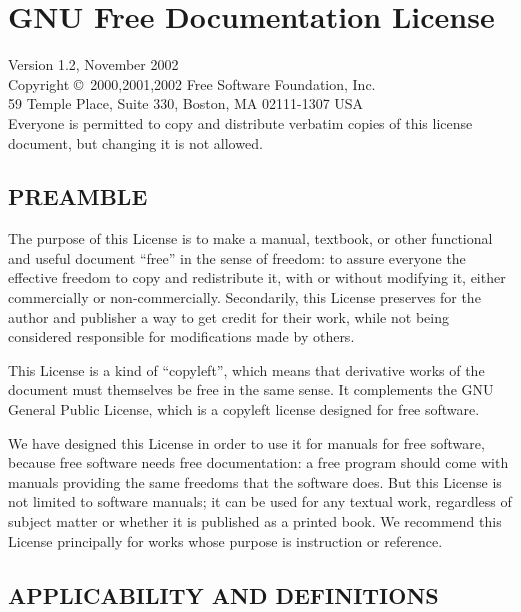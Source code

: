 \documentclass[10pt,a4paper,titlepage,twoside,openright]{report}
\begin{document}




\appendix
\chapter{GNU Free Documentation License}\label{fdl}

Version 1.2, November 2002 \\
Copyright \copyright\ 2000,2001,2002  Free Software Foundation, Inc.\\
59 Temple Place, Suite 330, Boston, MA  02111-1307  USA\\
Everyone is permitted to copy and distribute verbatim copies
of this license document, but changing it is not allowed.

\section*{PREAMBLE}

The purpose of this License is to make a manual, textbook, or other
functional and useful document ``free'' in the sense of freedom: to
assure everyone the effective freedom to copy and redistribute it,
with or without modifying it, either commercially or non-commercially.
Secondarily, this License preserves for the author and publisher a way
to get credit for their work, while not being considered responsible
for modifications made by others.

This License is a kind of ``copyleft'', which means that derivative
works of the document must themselves be free in the same sense.  It
complements the GNU General Public License, which is a copyleft
license designed for free software.

We have designed this License in order to use it for manuals for free
software, because free software needs free documentation: a free
program should come with manuals providing the same freedoms that the
software does.  But this License is not limited to software manuals;
it can be used for any textual work, regardless of subject matter or
whether it is published as a printed book.  We recommend this License
principally for works whose purpose is instruction or reference.


\section*{APPLICABILITY AND DEFINITIONS}
\label{applicability}
\end{document}
